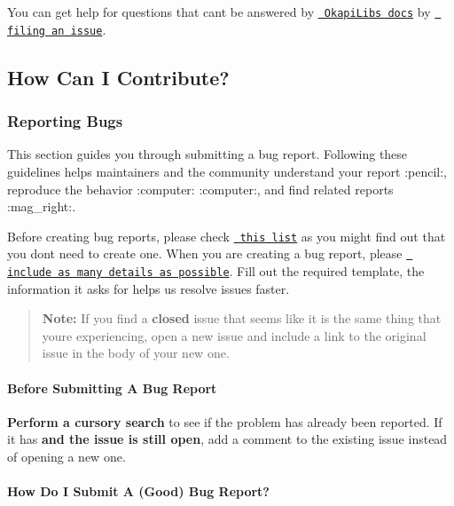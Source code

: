 You can get help for questions that can\textquotesingle{}t be answered by \href{https://pros.cs.purdue.edu/v5/okapi/index.html}{\texttt{ Okapi\+Lib\textquotesingle{}s docs}} by \href{https://github.com/OkapiLib/OkapiLib/issues/new/choose}{\texttt{ filing an issue}}.

\subsection*{How Can I Contribute?}

\subsubsection*{Reporting Bugs}

This section guides you through submitting a bug report. Following these guidelines helps maintainers and the community understand your report \+:pencil\+:, reproduce the behavior \+:computer\+: \+:computer\+:, and find related reports \+:mag\+\_\+right\+:.

Before creating bug reports, please check \href{\#before-submitting-a-bug-report}{\texttt{ this list}} as you might find out that you don\textquotesingle{}t need to create one. When you are creating a bug report, please \href{\#how-do-i-submit-a-good-bug-report}{\texttt{ include as many details as possible}}. Fill out the required template, the information it asks for helps us resolve issues faster.

\begin{quote}
{\bfseries{Note\+:}} If you find a {\bfseries{closed}} issue that seems like it is the same thing that you\textquotesingle{}re experiencing, open a new issue and include a link to the original issue in the body of your new one. \end{quote}


\paragraph*{Before Submitting A Bug Report}


\begin{DoxyItemize}
\item {\bfseries{Perform a cursory search}} to see if the problem has already been reported. If it has {\bfseries{and the issue is still open}}, add a comment to the existing issue instead of opening a new one.
\end{DoxyItemize}

\paragraph*{How Do I Submit A (Good) Bug Report?}

